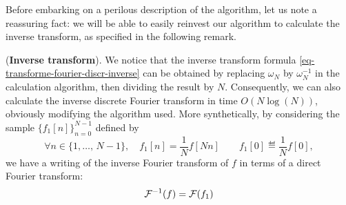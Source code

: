  
Before embarking on a perilous description of the algorithm, let us note a reassuring fact: we will be able to easily reinvest our algorithm to calculate the inverse transform, as specified in the following remark.
 
\begin{rem}{(\upshape \textbf{Inverse transform}).} 
 We notice that the inverse transform formula \eqref{eq-transforme-fourier-discr-inverse} can be obtained by replacing $ \omega_N $ by $ \omega_N^{-1} $ in the calculation algorithm, then dividing the result by $N$. Consequently, we can also calculate the inverse discrete Fourier transform in time $ O(N \log (N)) $, obviously modifying the algorithm used. More synthetically, by considering the sample $ \{f_1 [n]\}_{n = 0}^{N-1} $ defined by
\begin{equation*}
\forall n \in \{1, \ldots, \, N-1\}, \quad f_1 [n] = \frac{1}{N} f[Nn] \quad \quad f_1 [0] \eqdef \frac{1}{N} f[0],
\end{equation*}
we have a writing of the inverse Fourier transform of $ f $ in terms of a direct Fourier transform:
\begin{equation*}
\mathcal{F}^{-1} (f) = \mathcal{F}(f_1)
\end{equation*}
\end{rem}
 
 
 
